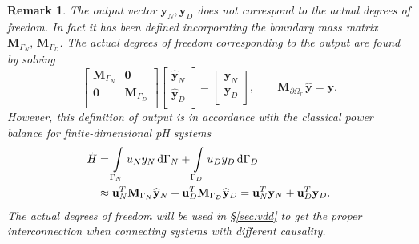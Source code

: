 \documentclass{ifacconf}
\newtheorem{remark}{Remark}
\newcommand{\secref}[1]{\S\ref{#1}}
\begin{document}
\begin{remark}
The output vector $\mathbf{y}_N, \mathbf{y}_D$ does not correspond to the actual degrees of freedom. In fact it has been defined incorporating the boundary mass matrix $\mathbf{M}_{\Gamma_N}, \, \mathbf{M}_{\Gamma_D}$. The actual degrees of freedom corresponding to the output are found by solving
\begin{equation}
\label{eq:y_dof}
\begin{bmatrix}
\mathbf{M}_{\Gamma_N} & \mathbf{0} \\
\mathbf{0} & \mathbf{M}_{\Gamma_D} \\
\end{bmatrix}
\begin{bmatrix}
\widehat{\mathbf{y}}_N \\
\widehat{\mathbf{y}}_D \\
\end{bmatrix} = 
\begin{bmatrix}
\mathbf{y}_N \\
\mathbf{y}_D \\
\end{bmatrix}, \qquad
\mathbf{M}_{\partial\Omega_r} \,  \widehat{\mathbf{y}} = \mathbf{y}.
\end{equation}
However, this definition of output is in accordance with the classical power balance for finite-dimensional pH systems
\begin{align*}
\dot{H} &= \int_{\Gamma_N} u_N y_N \d{\Gamma_N} + \int_{\Gamma_D} u_D y_D \d{\Gamma_D} \\
&\approx \mathbf{u}_N^T \mathbf{M}_{\Gamma_N} \widehat{\mathbf{y}}_N + \mathbf{u}_D^T \mathbf{M}_{\Gamma_D} \widehat{\mathbf{y}}_D = \mathbf{u}_N^T \mathbf{y}_N + \mathbf{u}_D^T \mathbf{y}_D.
\end{align*}
The actual degrees of freedom will be used in \secref{sec:vdd} to get the proper interconnection when connecting systems with different causality.
\end{remark}
\end{document}

